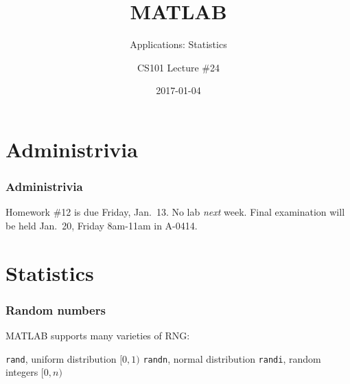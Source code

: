 \documentclass[11pt]{beamer}
\title{MATLAB}
\subtitle{Applications:  Statistics}
\author{CS101 Lecture \#24}
\date{2017-01-04}
\begin{document}
  \setcounter{showProgressBar}{0}
  \setcounter{showSlideNumbers}{0}

\frame{\titlepage}

\setcounter{framenumber}{0}
\setcounter{showProgressBar}{1}
\setcounter{showSlideNumbers}{1}

\section{Administrivia}

\begin{frame}
  \frametitle{Administrivia}
  \Enlarge

  \begin{itemize}
  \myitem  Homework \#12 is due Friday, Jan.\ 13.  %
  \myitem  No lab \emph{next} week.  %
  \myitem  Final examination will be held Jan.\ 20, Friday 8am-11am in A-0414.  %
  \end{itemize}
\end{frame}


\section{Statistics}

\begin{frame}[fragile]
  \frametitle{Random numbers}
  \Enlarge

  \begin{enumerate}
  \myitem  MATLAB supports many varieties of RNG:
    \begin{enumerate}
    \mysubitem  \texttt{rand}, uniform distribution $[0,1)$
    \mysubitem  \texttt{randn}, normal distribution
    \mysubitem  \texttt{randi}, random integers $[0,n)$
    \end{enumerate}
  \end{enumerate}
\end{frame}
\end{document}
